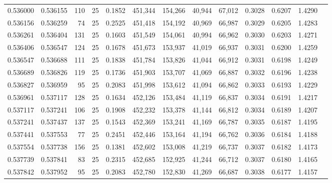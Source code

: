 \begin{tabular}{rrrrrrrrrrrrr}
0.536000 & 0.536155 &   110 &  25 &                                     0.1852 & 451,344 & 154,266 &  40,944 &  67,012 & 0.3028 & 0.6207 & 1.4290 \\
0.536156 & 0.536259 &    74 &  25 &                                     0.2525 & 451,418 & 154,192 &  40,969 &  66,987 & 0.3029 & 0.6205 & 1.4283 \\
0.536261 & 0.536404 &   131 &  25 &                                     0.1603 & 451,549 & 154,061 &  40,994 &  66,962 & 0.3030 & 0.6203 & 1.4271 \\
0.536406 & 0.536547 &   124 &  25 &                                     0.1678 & 451,673 & 153,937 &  41,019 &  66,937 & 0.3031 & 0.6200 & 1.4259 \\
0.536547 & 0.536688 &   111 &  25 &                                     0.1838 & 451,784 & 153,826 &  41,044 &  66,912 & 0.3031 & 0.6198 & 1.4249 \\
0.536689 & 0.536826 &   119 &  25 &                                     0.1736 & 451,903 & 153,707 &  41,069 &  66,887 & 0.3032 & 0.6196 & 1.4238 \\
0.536827 & 0.536959 &    95 &  25 &                                     0.2083 & 451,998 & 153,612 &  41,094 &  66,862 & 0.3033 & 0.6193 & 1.4229 \\
0.536961 & 0.537117 &   128 &  25 &                                     0.1634 & 452,126 & 153,484 &  41,119 &  66,837 & 0.3034 & 0.6191 & 1.4217 \\
0.537117 & 0.537241 &   106 &  25 &                                     0.1908 & 452,232 & 153,378 &  41,144 &  66,812 & 0.3034 & 0.6189 & 1.4207 \\
0.537241 & 0.537437 &   137 &  25 &                                     0.1543 & 452,369 & 153,241 &  41,169 &  66,787 & 0.3035 & 0.6187 & 1.4195 \\
0.537441 & 0.537553 &    77 &  25 &                                     0.2451 & 452,446 & 153,164 &  41,194 &  66,762 & 0.3036 & 0.6184 & 1.4188 \\
0.537554 & 0.537738 &   156 &  25 &                                     0.1381 & 452,602 & 153,008 &  41,219 &  66,737 & 0.3037 & 0.6182 & 1.4173 \\
0.537739 & 0.537841 &    83 &  25 &                                     0.2315 & 452,685 & 152,925 &  41,244 &  66,712 & 0.3037 & 0.6180 & 1.4165 \\
0.537842 & 0.537952 &    95 &  25 &                                     0.2083 & 452,780 & 152,830 &  41,269 &  66,687 & 0.3038 & 0.6177 & 1.4157 \\

\end{tabular}

